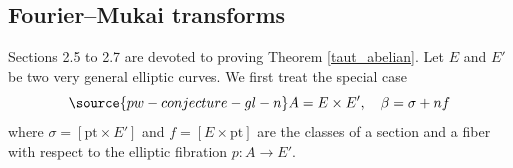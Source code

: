 \subsection{Fourier--Mukai transforms}\label{Sec2.5} Sections 2.5 to 2.7 are devoted to proving Theorem \ref{taut_abelian}. Let $E$ and $E'$ be two very general elliptic curves. We first treat the special case
\begin{equation}\label{special}
\source{pw-conjecture-gl-n}
A= E \times E', \quad \beta = \sigma + nf
\end{equation}
where $\sigma = [\mathrm{pt} \times E']$ and $f = [E \times \mathrm{pt}]$ are the classes of a section and a fiber with respect to the elliptic fibration $p: A \to E'$.

